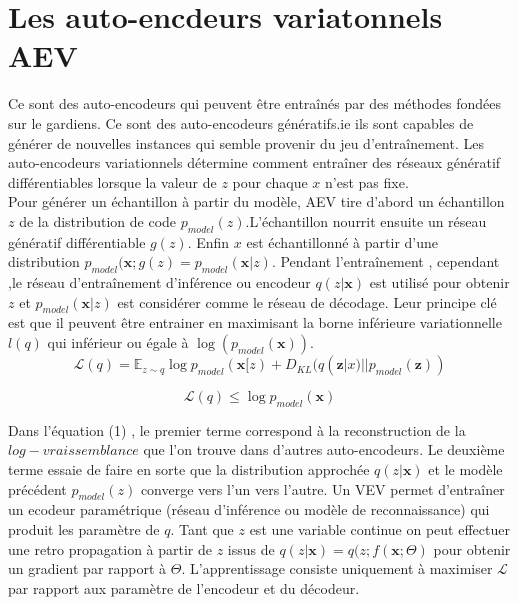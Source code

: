\documentclass[12pt,a4paper]{report}
\begin{document}
\section{Les auto-encdeurs variatonnels AEV}
Ce sont des auto-encodeurs qui peuvent être entraînés par des méthodes fondées sur le gardiens. Ce sont des auto-encodeurs génératifs.ie ils sont capables de générer de nouvelles instances qui semble provenir du jeu d’entraînement. Les auto-encodeurs variationnels détermine comment entraîner des réseaux génératif différentiables lorsque la valeur de $z$ pour chaque $x$ n'est pas fixe. \\
Pour générer un échantillon à partir du modèle, AEV tire d'abord un échantillon $z$ de la distribution de code  $p_{model}(z)$.L'échantillon nourrit ensuite un réseau génératif différentiable $g(z)$. Enfin $x$ est échantillonné à partir d'une distribution $p_{model}(\textbf{x};g(z)=p_{model}(\textbf{x}|z)$. Pendant l’entraînement , cependant ,le réseau d’entraînement d'inférence ou encodeur $q(z|\textbf{x})$ est utilisé pour obtenir $z$ et  $p_{model}(\textbf{x}|z)$ est considérer comme le réseau de décodage. Leur principe clé est que il peuvent être entrainer en maximisant la borne inférieure variationnelle $l(q)$ qui inférieur ou égale à $\log (p_{model}(\textbf{x}))$.
\begin{equation}
\mathcal{L}(q)=\mathbb{E}_{z \sim  q} \log p_{model} (\textbf{x}[z)+ D_{KL}(q(\textbf{z}|x) || p_{model}(\textbf{z})) 
\end{equation}

\begin{equation}
\mathcal{L}(q) \leq \log  p_{model}(\textbf{x})
\end{equation}

Dans l’équation (1) , le premier terme correspond à la reconstruction de la $log-vraissemblance$ que l'on trouve dans d'autres auto-encodeurs. Le deuxième terme essaie de faire en sorte que la distribution approchée $q(z|\textbf{x})$ et le modèle précédent $p_{model}(z)$ converge vers l'un vers l'autre. Un VEV permet d'entraîner un ecodeur paramétrique  (réseau d'inférence ou modèle de reconnaissance) qui produit les paramètre de  $q$. Tant que $z$ est une variable continue on peut effectuer une retro propagation   à partir de $z$ issus de 
$q(z|\textbf{x}) =   q(z;f(\textbf{x}; \Theta )$  pour obtenir un gradient par rapport à $ \Theta$. L'apprentissage consiste uniquement à maximiser  $\mathcal{L}$ 
par rapport aux paramètre de l'encodeur et du décodeur.
\end{document}
